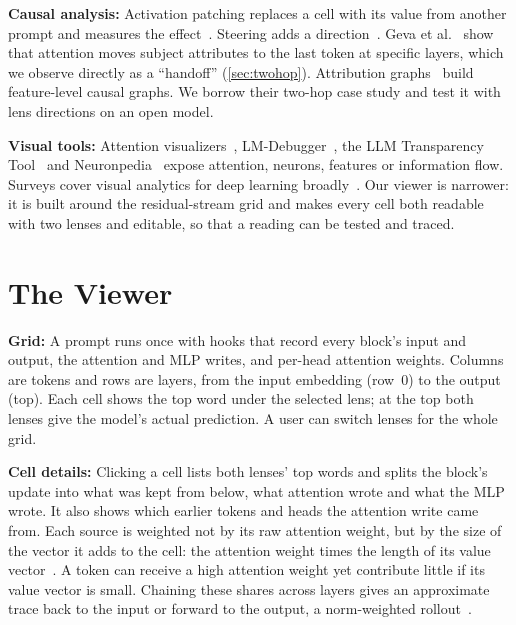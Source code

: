 \documentclass{vgtc}       %
\begin{document}
\textbf{Causal analysis:} Activation patching replaces a cell with its value from another prompt and measures the
effect~\cite{meng2022rome, zhang2024patching, heimersheim2024patching}. Steering adds a direction~\cite{turner2023actadd,
todd2024function}. Geva et al.~\cite{geva2023dissecting} show that attention moves subject attributes to the last
token at specific layers, which we observe directly as a ``handoff'' (\cref{sec:twohop}). Attribution
graphs~\cite{ameisen2025circuit, lindsey2025biology} build feature-level causal graphs. We borrow their two-hop case
study and test it with lens directions on an open model.

\textbf{Visual tools:} Attention visualizers~\cite{vig2019bertviz}, LM-Debugger~\cite{geva2022lmdebugger}, the
LLM Transparency Tool~\cite{tufanov2024lmtt} and Neuronpedia~\cite{neuronpedia} expose attention, neurons, features or
information flow. Surveys cover visual analytics for deep learning broadly~\cite{hohman2019survey}. Our viewer is
narrower: it is built around the residual-stream grid and makes every cell both readable with two lenses and
editable, so that a reading can be tested and traced.

\section{The Viewer}
\label{sec:tool}
  \;\;
\textbf{Grid:} A prompt runs once with hooks that record every block's input and output, the attention and MLP
writes, and per-head attention weights. Columns are tokens and rows are layers, from the input embedding (row~0) to
the output (top). Each cell shows the top word under the selected lens; at the top both lenses give the model's
actual prediction. A user can switch lenses for the whole grid.

\textbf{Cell details:} Clicking a cell lists both lenses' top words and splits the block's update into what was kept
from below, what attention wrote and what the MLP wrote. It also shows which earlier tokens and heads the attention
write came from. Each source is weighted not by its raw attention weight, but by the size of the vector it adds to the
cell: the attention weight times the length of its value vector~\cite{kobayashi2020norm}. A token can receive a high
attention weight yet contribute little if its value vector is small. Chaining these shares across layers gives an
approximate trace back to the input or forward to the output, a norm-weighted rollout~\cite{abnar2020flow}.
\end{document}
